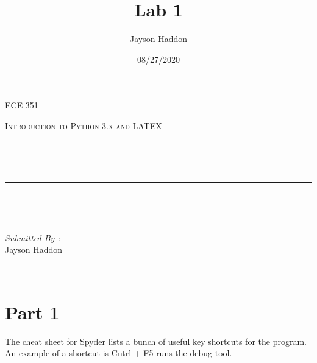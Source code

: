 \documentclass[11pt,a4]{report}
\title{Lab 1}
\author{Jayson Haddon}
\date{08/27/2020}
\makeatletter
\let\thetitle\@title
\makeatother
\begin{document}

\begin{titlepage}
	\centering
    \vspace*{0.5 cm}
\begin{center}    \textsc{\Large   ECE 351 }\\[2.0 cm]	\end{center}%
	\textsc{\Large Introduction to Python 3.x and LATEX  }\\[0.5 cm]				%
	\rule{\linewidth}{0.2 mm} \\[0.4 cm]
	{ \huge \bfseries \thetitle}\\
	\rule{\linewidth}{0.2 mm} \\[1.5 cm]
	
	\begin{minipage}{0.4\textwidth}
		\begin{flushleft} \large
			\end{flushleft}
			\end{minipage}~
			\begin{minipage}{0.4\textwidth}
            
			\begin{flushright} \large
			\emph{Submitted By :} \\
			Jayson Haddon  
		\end{flushright}
           
	\end{minipage}\\[2 cm]
	
    
    
    
    
	
\end{titlepage}

\renewcommand{\thesection}{\arabic{section}}
\section{Part 1}

The cheat sheet for Spyder lists a bunch of useful key shortcuts for the program. An example of a shortcut is Cntrl + F5 runs the debug tool. 
\end{document}
